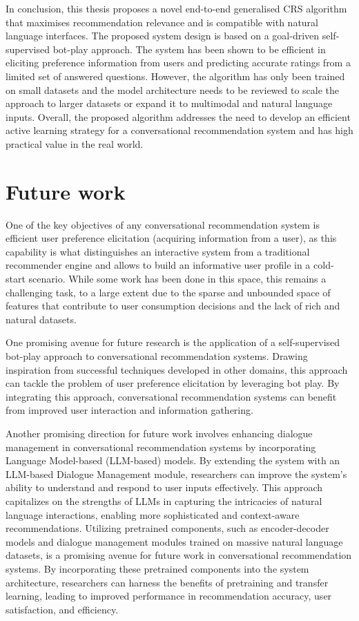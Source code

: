 In conclusion, this thesis proposes a novel end-to-end generalised CRS algorithm that maximises recommendation relevance and is compatible with natural language interfaces. The proposed system design is based on a goal-driven self-supervised bot-play approach. The system has been shown to be efficient in eliciting preference information from users and predicting accurate ratings from a limited set of answered questions. However, the algorithm has only been trained on small datasets and the model architecture needs to be reviewed to scale the approach to larger datasets or expand it to multimodal and natural language inputs. Overall, the proposed algorithm addresses the need to develop an efficient active learning strategy for a conversational recommendation system and has high practical value in the real world.


\section{Future work}

One of the key objectives of any conversational recommendation system is efficient user preference elicitation (acquiring information from a user), as this capability is what distinguishes an interactive system from a traditional recommender engine and allows to build an informative user profile in a cold-start scenario. While some work has been done in this space, this remains a challenging task, to a large extent due to the sparse and unbounded space of features that contribute to user consumption decisions and the lack of rich and natural datasets.

One promising avenue for future research is the application of a self-supervised bot-play approach to conversational recommendation systems. Drawing inspiration from successful techniques developed in other domains, this approach can tackle the problem of user preference elicitation by leveraging bot play. By integrating this approach, conversational recommendation systems can benefit from improved user interaction and information gathering.

Another promising direction for future work involves enhancing dialogue management in conversational recommendation systems by incorporating Language Model-based (LLM-based) models. By extending the system with an LLM-based Dialogue Management module, researchers can improve the system's ability to understand and respond to user inputs effectively. This approach capitalizes on the strengths of LLMs in capturing the intricacies of natural language interactions, enabling more sophisticated and context-aware recommendations. Utilizing pretrained components, such as encoder-decoder models and dialogue management modules trained on massive natural language datasets, is a promising avenue for future work in conversational recommendation systems. By incorporating these pretrained components into the system architecture, researchers can harness the benefits of pretraining and transfer learning, leading to improved performance in recommendation accuracy, user satisfaction, and efficiency.

